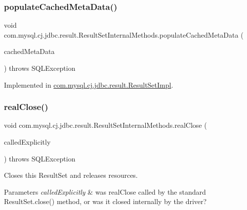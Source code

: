 \subsubsection{\texorpdfstring{populate\+Cached\+Meta\+Data()}{populateCachedMetaData()}}
{\footnotesize\ttfamily void com.\+mysql.\+cj.\+jdbc.\+result.\+Result\+Set\+Internal\+Methods.\+populate\+Cached\+Meta\+Data (\begin{DoxyParamCaption}\item[{\mbox{\hyperlink{interfacecom_1_1mysql_1_1cj_1_1jdbc_1_1result_1_1_cached_result_set_meta_data}{Cached\+Result\+Set\+Meta\+Data}}}]{cached\+Meta\+Data }\end{DoxyParamCaption}) throws S\+Q\+L\+Exception}



Implemented in \mbox{\hyperlink{classcom_1_1mysql_1_1cj_1_1jdbc_1_1result_1_1_result_set_impl_ad7430baab428d355723d41517ec3ae0d}{com.\+mysql.\+cj.\+jdbc.\+result.\+Result\+Set\+Impl}}.

\mbox{\label{interfacecom_1_1mysql_1_1cj_1_1jdbc_1_1result_1_1_result_set_internal_methods_a0102042bd0710772308db537f40e2286}} 
\subsubsection{\texorpdfstring{real\+Close()}{realClose()}}
{\footnotesize\ttfamily void com.\+mysql.\+cj.\+jdbc.\+result.\+Result\+Set\+Internal\+Methods.\+real\+Close (\begin{DoxyParamCaption}\item[{boolean}]{called\+Explicitly }\end{DoxyParamCaption}) throws S\+Q\+L\+Exception}

Closes this Result\+Set and releases resources.


\begin{DoxyParams}{Parameters}
{\em called\+Explicitly} & was real\+Close called by the standard Result\+Set.\+close() method, or was it closed internally by the driver? \\
\hline
\end{DoxyParams}

